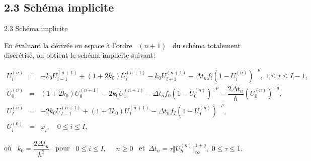 \documentclass[10pt]{beamer}
\begin{document}
\begin{frame}
 
\subsection{2.3 Schéma implicite }
\begin{block}{2.3 Schéma implicite}\end{block}
     En évaluant la dérivée en espace à l'ordre \ $ (n+1) $ \  du schéma totalement discrétisé,  on obtient le schéma implicite suivant:   
        
        \begin{block}
        
       
        \begin{eqnarray*} 
	U^{(n)}_{i}&=&-k_{0}U^{(n+1)}_{i-1}+(1+2k_{0}) U^{(n+1)}_{i}-k_{0}U^{(n+1)}_{i+1}-\Delta t_{n}f_{i}\left(1-U^{(n)}_{i}\right)^{-p},\ 1\leqslant i\leqslant I-1, \label{cha2equ9} \\
	U^{(n)}_{0}&=& (1+2k_{0})U^{(n+1)}_{0} -2k_{0}U^{(n+1)}_{1}-\Delta t_{n}f_{0}\left(1-U^{(n)}_{0}\right)^{-p}-\dfrac{2\Delta t_{n}}{h}\left(U^{(n)}_{0}\right)^{-q},\label{cha2equ10}\\
	U^{(n)}_{I}&=&-2k_{0}U^{(n+1)}_{I-1}+ (1+2k_{0})U^{(n+1)}_{I}-\Delta t_{n}f_{I}\left(1-U^{(n)}_{I}\right)^{-p},  \label{cha2equ11}\\
	U_i^{(0)}&=&\varphi_i,\quad  0\leqslant i\leqslant I, \label{cha2equ12}
        \end{eqnarray*}
        
      \end{block}
        où \ $k_0=\dfrac{2\Delta t_{n}}{h^{2}}$ \ pour  \ $ 0\leqslant i\leqslant I,$ \  \ $n\geqslant 0$ \ et\ $\Delta t_n= \tau\Vert U_h^{(n)}\Vert_{\infty}^{{1+q}},$  $0\leq\tau \leq 1 .$\ \\
    
      \end{frame} 
      
\end{document}
